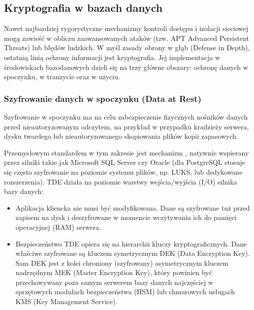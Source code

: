 \documentclass[a4paper,11pt,english,openany,oneside]{sphinxmanual}
\begin{document}
\sphinxstepscope


\subsection{Kryptografia w bazach danych}
\label{\detokenize{rozdzial_2/rozdzial_27/rozdzial_4:kryptografia-w-bazach-danych}}\label{\detokenize{rozdzial_2/rozdzial_27/rozdzial_4::doc}}
\sphinxAtStartPar
Nawet najbardziej rygorystyczne mechanizmy kontroli dostępu i izolacji sieciowej mogą zawieść w obliczu zaawansowanych ataków (tzw. APT \textendash{} Advanced Persistent Threats) lub błędów ludzkich. W myśl zasady obrony w głąb (Defense in Depth), ostatnią linią ochrony informacji jest kryptografia. Jej implementacja w środowiskach bazodanowych dzieli się na trzy główne obszary: ochronę danych w spoczynku, w tranzycie oraz w użyciu.


\subsubsection{Szyfrowanie danych w spoczynku (Data at Rest)}
\label{\detokenize{rozdzial_2/rozdzial_27/rozdzial_4:szyfrowanie-danych-w-spoczynku-data-at-rest}}
\sphinxAtStartPar
Szyfrowanie w spoczynku ma na celu zabezpieczenie fizycznych nośników danych przed nieautoryzowanym odczytem, na przykład w przypadku kradzieży serwera, dysku twardego lub nieautoryzowanego skopiowania plików kopii zapasowych.

\sphinxAtStartPar
Przemysłowym standardem w tym zakresie jest mechanizm , natywnie wspierany przez silniki takie jak Microsoft SQL Server czy Oracle (dla PostgreSQL stosuje się często szyfrowanie na poziomie systemu plików, np. LUKS, lub dedykowane rozszerzenia). TDE działa na poziomie warstwy wejścia/wyjścia (I/O) silnika bazy danych:
\begin{itemize}
\item {} 
\sphinxAtStartPar
{} Aplikacja kliencka nie musi być modyfikowana. Dane są szyfrowane tuż przed zapisem na dysk i deszyfrowane w momencie wczytywania ich do pamięci operacyjnej (RAM) serwera.

\item {} 
\sphinxAtStartPar
{} Bezpieczeństwo TDE opiera się na hierarchii kluczy kryptograficznych. Dane właściwe szyfrowane są kluczem symetrycznym DEK (Data Encryption Key). Sam DEK jest z kolei chroniony (szyfrowany) asymetrycznym kluczem nadrzędnym MEK (Master Encryption Key), który powinien być przechowywany poza samym serwerem bazy danych \textendash{} najczęściej w sprzętowych modułach bezpieczeństwa (HSM) lub chmurowych usługach KMS (Key Management Service).

\end{itemize}
\end{document}
